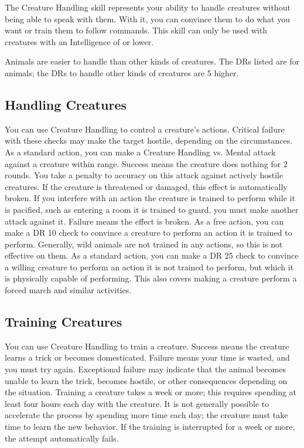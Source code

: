     The Creature Handling skill represents your ability to handle creatures without being able to speak with them. With it, you can convince them to do what you want or train them to follow commands. This skill can only be used with creatures with an Intelligence of  or lower.

        Animals are easier to handle than other kinds of creatures. The DRs listed are for animals; the DRs to handle other kinds of creatures are 5 higher.

    \subsection{Handling Creatures}
        You can use Creature Handling to control a creature's actions. Critical failure with these checks may make the target hostile, depending on the circumstances.
         As a standard action, you can make a Creature Handling vs. Mental attack against a creature within \rngmed range. Success means the creature does nothing for 2 rounds. You take a  penalty to accuracy on this attack against actively hostile creatures. If the creature is threatened or damaged, this effect is automatically broken. If you interfere with an action the creature is trained to perform while it is pacified, such as entering a room it is trained to guard, you must make another attack against it. Failure means the effect is broken.
         As a free action, you can make a DR 10 check to convince a creature to perform an action it is trained to perform. Generally, wild animals are not trained in any actions, so this is not effective on them.
         As a standard action, you can make a DR 25 check to convince a willing creature to perform an action it is not trained to perform, but which it is physically capable of performing. This also covers making a creature perform a forced march and similar activities.

    \subsection{Training Creatures}\label{Training Creatures}
        You can use Creature Handling to train a creature. Success means the creature learns a trick or becomes domesticated. Failure means your time is wasted, and you must try again. Exceptional failure may indicate that the animal becomes unable to learn the trick, becomes hostile, or other consequences depending on the situation. Training a creature takes a week or more; this requires spending at least four hours each day with the creature. It is not generally possible to accelerate the process by spending more time each day; the creature must take time to learn the new behavior. If the training is interrupted for a week or more, the attempt automatically fails.

